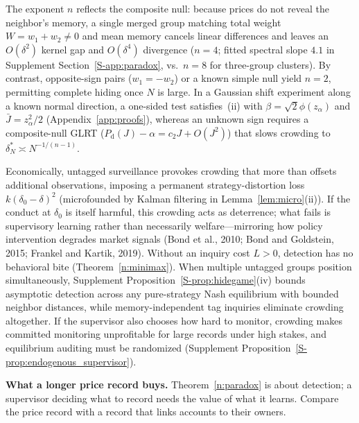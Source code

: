 \documentclass[11pt,letterpaper]{article}
\theoremstyle{definition}
\begin{document}
The exponent $n$ reflects the composite null: because prices do not reveal the neighbor's memory, a single merged group matching total weight $W = w_1 + w_2 \neq 0$ and mean memory cancels linear differences and leaves an $O(\delta^2)$ kernel gap and $O(\delta^4)$ divergence ($n = 4$; fitted spectral slope $4.1$ in Supplement Section~\ref{S-app:paradox}, vs.\ $n = 8$ for three-group clusters). By contrast, opposite-sign pairs ($w_1 = -w_2$) or a known simple null yield $n = 2$, permitting complete hiding once $N$ is large. In a Gaussian shift experiment along a known normal direction, a one-sided test satisfies~(ii) with $\beta = \sqrt{2}\phi(z_\alpha)$ and $\bar{J} = z_\alpha^2 / 2$ (Appendix~\ref{app:proofs}), whereas an unknown sign requires a composite-null GLRT ($P_{\mathrm{d}}(J) - \alpha = c_2 J + O(J^2)$) that slows crowding to $\delta_N^* \asymp N^{-1/(n-1)}$.

Economically, untagged surveillance provokes crowding that more than offsets additional observations, imposing a permanent strategy-distortion loss $k(\delta_0 - \delta)^2$ (microfounded by Kalman filtering in Lemma~\ref{lem:micro}(ii)). If the conduct at $\delta_0$ is itself harmful, this crowding acts as deterrence; what fails is supervisory learning rather than necessarily welfare---mirroring how policy intervention degrades market signals (Bond et al., 2010; Bond and Goldstein, 2015; Frankel and Kartik, 2019). Without an inquiry cost $L > 0$, detection has no behavioral bite (Theorem~\ref{n:minimax}). When multiple untagged groups position simultaneously, Supplement Proposition~\ref{S-prop:hidegame}(iv) bounds asymptotic detection across any pure-strategy Nash equilibrium with bounded neighbor distances, while memory-independent tag inquiries eliminate crowding altogether. If the supervisor also chooses how hard to monitor, crowding makes committed monitoring unprofitable for large records under high stakes, and equilibrium auditing must be randomized (Supplement Proposition~\ref{S-prop:endogenous_supervisor}).

\textbf{What a longer price record buys.} Theorem~\ref{n:paradox} is about detection; a supervisor deciding what to record needs the value of what it learns. Compare the price record with a record that links accounts to their owners.
\end{document}
